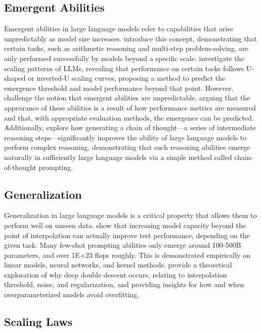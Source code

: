 \subsection{Emergent Abilities}

Emergent abilities in large language models refer to capabilities that arise unpredictably as model size increases. \citet{wei2022emergent} introduce this concept, demonstrating that certain tasks, such as arithmetic reasoning and multi-step problem-solving, are only performed successfully by models beyond a specific scale. \citet{wu2024u} investigate the scaling patterns of LLMs, revealing that performance on certain tasks follows U-shaped or inverted-U scaling curves, proposing a method to predict the emergence threshold and model performance beyond that point. However, \citet{schaeffer2023mirage} challenge the notion that emergent abilities are unpredictable, arguing that the appearance of these abilities is a result of how performance metrics are measured and that, with appropriate evaluation methods, the emergence can be predicted. Additionally, \citet{wei2022chain} explore how generating a chain of thought—a series of intermediate reasoning steps—significantly improves the ability of large language models to perform complex reasoning, demonstrating that such reasoning abilities emerge naturally in sufficiently large language models via a simple method called chain-of-thought prompting.

\subsection{Generalization}

Generalization in large language models is a critical property that allows them to perform well on unseen data. \citet{belkin2019reconciling} show that increasing model capacity beyond the point of interpolation can actually improve test performance, depending on the given task. Many few-shot prompting abilities only emerge around 100-500B parameters, and over 1E+23 flops roughly. This is demonstrated empirically on linear models, neural networks, and kernel methods. \citet{yilmaz2022regularization} provide a theoretical exploration of why deep double descent occurs, relating to interpolation threshold, noise, and regularization, and providing insights for how and when overparameterized models avoid overfitting.

\subsection{Scaling Laws}


